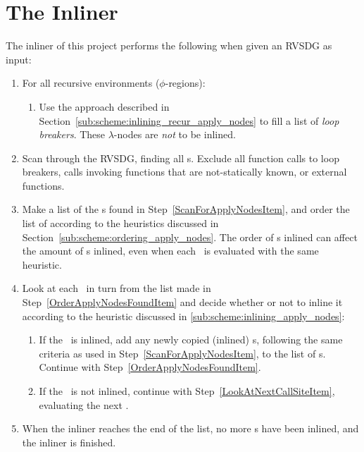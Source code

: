 
\clearpage
\section{The Inliner}
\label{scheme:start}


The inliner of this project performs the following when given an RVSDG as input:

\begin{enumerate}
	\item For all recursive environments ($\phi$-regions):

	\begin{enumerate}
		\item Use the approach described in
Section~\ref{sub:scheme:inlining_recur_apply_nodes} to fill a list of
\textit{loop breakers}. These $\lambda$-nodes are \textit{not} to be inlined.
		\label{MakeLoopBreakerListItem}
	\end{enumerate}

	\item Scan through the RVSDG, finding all \applyNode s. Exclude all function
calls to loop breakers, calls invoking functions that are not-statically known,
or external functions.
	\label{ScanForApplyNodesItem}

	\item Make a list of the \applyNode s found in
Step~\ref{ScanForApplyNodesItem}, and order the list of according to the
heuristics discussed in Section~\ref{sub:scheme:ordering_apply_nodes}.
The order of \applyNode s inlined can affect the amount of \applyNode s inlined,
even when each \applyNode~is evaluated with the same heuristic.
	\label{OrderApplyNodesFoundItem}

	\item Look at each \applyNode~in turn from the list made in
Step~\ref{OrderApplyNodesFoundItem} and decide whether or not to inline it
according to the heuristic discussed in \ref{sub:scheme:inlining_apply_nodes}:
	\label{LookAtNextCallSiteItem}

	\begin{enumerate}
		\item If the \applyNode~is inlined, add any newly copied (inlined)
\applyNode s, following the same criteria as used in
Step~\ref{ScanForApplyNodesItem}, to the list of \applyNode s. Continue with
Step~\ref{OrderApplyNodesFoundItem}.

		\item If the \applyNode~is not inlined, continue with
Step~\ref{LookAtNextCallSiteItem}, evaluating the next \applyNode .
		\label{InlineCallSiteItem}
	\end{enumerate}

	\item When the inliner reaches the end of the list, no more \applyNode s
have been inlined, and the inliner is finished.
\end{enumerate}

